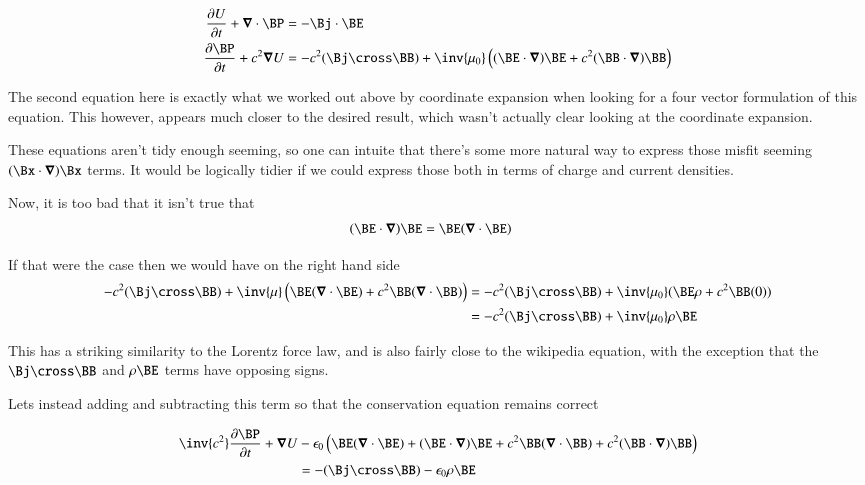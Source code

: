 \documentclass{article}
\begin{document}
\begin{align}\label{eqn:withPoyntingAndEnergy}
\PD{t}{U} + \spacegrad \cdot \BP &= -\Bj \cdot \BE \\
\PD{t}{\BP} + c^2 \spacegrad U &= -c^2 (\Bj \cross \BB) + \inv{\mu_0} \left( (\BE \cdot \spacegrad) \BE + c^2 (\BB \cdot \spacegrad) \BB \right) 
\end{align}

The second equation here is exactly what we worked out above by coordinate expansion when looking for a four vector formulation
of this equation.  This however, appears much closer to the desired result, which wasn't actually clear looking at the
coordinate expansion.

These equations aren't tidy enough seeming, so one can intuite that there's some more natural way to express those
misfit seeming $(\Bx \cdot \spacegrad) \Bx$ terms.
It would be logically tidier if we could express those both in terms of charge and current densities.

Now, it is too bad that it isn't true that
\begin{align*}
(\BE \cdot \spacegrad) \BE &= \BE (\spacegrad \cdot \BE) 
\end{align*}

If that were the case then we would have on the right hand side
\begin{align*}
-c^2(\Bj \cross \BB)
+
\inv{\mu} \left(
\BE (\spacegrad \cdot \BE) + c^2 \BB (\spacegrad \cdot \BB) 
\right) 
&=
-c^2(\Bj \cross \BB) +
\inv{\mu_0} (\BE \rho + c^2 \BB (0)) \\
&= -c^2(\Bj \cross \BB) + \inv{\mu_0} \rho \BE \\
\end{align*}

This has a striking similarity to the Lorentz force law, and is also fairly close to the wikipedia equation, with the exception that the
$\Bj \cross \BB$ and $\rho \BE$ terms have opposing signs.

Lets instead adding and subtracting this term so that the conservation equation remains correct

\begin{align*}
\inv{c^2} \PD{t}{\BP} + \spacegrad U &-\epsilon_0 \left( 
\BE (\spacegrad \cdot \BE) +(\BE \cdot \spacegrad) \BE 
+ c^2 \BB (\spacegrad \cdot \BB) + c^2 (\BB \cdot \spacegrad) \BB 
\right) \\
&= -(\Bj \cross \BB) - \epsilon_0 \rho \BE 
\end{align*}
\end{document}
